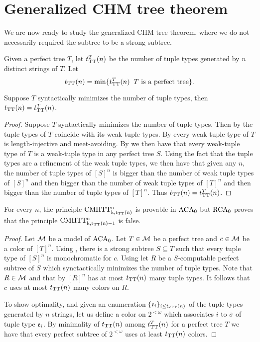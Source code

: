 \section{Generalized CHM tree theorem}

We are now ready to study the generalized CHM tree theorem, where we do not necessarily required the subtree to be a strong subtree.

\begin{definition}
Given a perfect tree $T$, let $t^T_{\mathrm{TT}}(n)$ be the number of tuple types generated by $n$ distinct strings of $T$. Let 
$$t_{\mathrm{TT}}(n) = \min \{t^T_{\mathrm{TT}}(n)\:\ T \text{ is a perfect tree}\}.$$
\end{definition}

\begin{theorem} \label{th:reallyminimizes}
Suppose $T$ syntactically minimizes the number of tuple types, then $t_{\mathrm{TT}}(n) = t_{\mathrm{TT}}^T(n)$.
\end{theorem}
\begin{proof}
Suppose $T$ syntactically minimizes the number of tuple types. Then by  the tuple types of $T$ coincide with its weak tuple types. By  every weak tuple type of $T$ is length-injective and meet-avoiding. By  we then have that every weak-tuple type of $T$ is a weak-tuple type in any perfect tree $S$. Using the fact that the tuple types are a refinement of the weak tuple types, we then have that given any $n$, the number of tuple types of $[S]^{n}$ is bigger than the number of weak tuple types of $[S]^{n}$ and then bigger than the number of weak tuple types of $[T]^{n}$ and then bigger than the number of tuple types of $[T]^{n}$. Thus $t_{\mathrm{TT}}(n) = t_{\mathrm{TT}}^T(n)$.
\end{proof}

\begin{theorem}
For every $n$, the principle $\mathrm{CMHTT^n_{k,t_{\mathrm{TT}}(n)}}$ is provable in $\mathrm{ACA}_0$ but $\mathrm{RCA}_0$ proves that the principle $\mathrm{CMHTT^n_{k,t_{\mathrm{TT}}(n)-1}}$ is false.
\end{theorem}
\begin{proof}
Let $\mathcal{M}$ be a model of $\mathrm{ACA}_0$. Let $T \in \mathcal{M}$ be a perfect tree and $c \in \mathcal{M}$ be a color of $[T]^n$. Using , there is a strong subtree $S \subseteq T$ such that every tuple type of $[S]^n$ is monochromatic for $c$. Using  let $R$ be a $S$-computable perfect subtree of $S$ which synctactically minimizes the number of tuple types. Note that $R \in \mathcal{M}$ and that by  $[R]^n$ has at most $t_{\mathrm{TT}}(n)$ many tuple types. It follows that $c$ uses at most $t_{\mathrm{TT}}(n)$ many colors on $R$.

To show optimality, and given an enumeration $\{\mathfrak{e}_i\}_{i \leq t_{\mathrm{sTT}}(n)}$ of the tuple types generated by $n$ strings, let us define a color on $2^{<\omega}$ which associates $i$ to $\overline{\sigma}$ of tuple type $\mathfrak{e}_i$. By minimality of $t_{\mathrm{TT}}(n)$ among $t^T_{\mathrm{TT}}(n)$ for a perfect tree $T$ we have that every perfect subtree of $2^{<\omega}$ uses at least $t_{\mathrm{TT}}(n)$ colors.
\end{proof}

